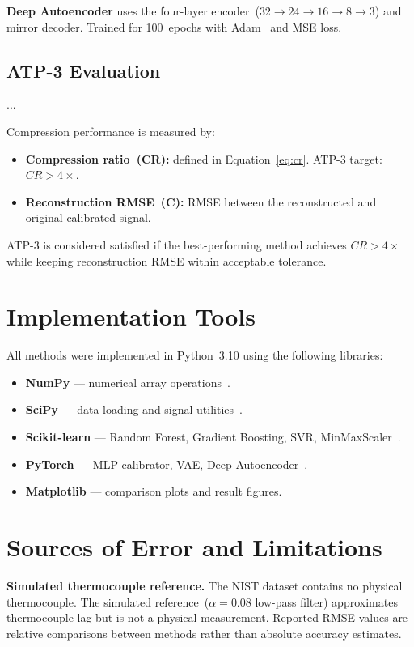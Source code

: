 \textbf{Deep Autoencoder} uses the four-layer encoder~($32\!\rightarrow\!24\!\rightarrow\!16\!\rightarrow\!8\!\rightarrow\!3$) and mirror decoder. Trained for 100~epochs with Adam~\cite{kingma2014adam} and MSE loss.

\subsection{ATP-3 Evaluation}
...

Compression performance is measured by:
\begin{itemize}[leftmargin=2em, nosep]
\item \textbf{Compression ratio~(CR):} defined in Equation~\eqref{eq:cr}. ATP-3 target: $CR > 4\times$.
\item \textbf{Reconstruction RMSE~(\textdegree C):} RMSE between the reconstructed and original calibrated signal.
\end{itemize}

ATP-3 is considered satisfied if the best-performing method achieves $CR > 4\times$ while keeping reconstruction RMSE within acceptable tolerance.

\section{Implementation Tools}
\label{sec:tools}

All methods were implemented in Python~3.10 using the following libraries:
\begin{itemize}[leftmargin=2em, nosep]
\item \textbf{NumPy} --- numerical array operations~\cite{scipy}.
\item \textbf{SciPy} --- data loading and signal utilities~\cite{scipy}.
\item \textbf{Scikit-learn} --- Random Forest, Gradient Boosting, SVR, MinMaxScaler~\cite{scikit-learn}.
\item \textbf{PyTorch} --- MLP calibrator, VAE, Deep Autoencoder~\cite{pytorch}.
\item \textbf{Matplotlib} --- comparison plots and result figures.
\end{itemize}

\section{Sources of Error and Limitations}
\label{sec:limitations-ch3}

\textbf{Simulated thermocouple reference.} The NIST dataset contains no physical thermocouple. The simulated reference~($\alpha=0.08$ low-pass filter) approximates thermocouple lag but is not a physical measurement. Reported RMSE values are relative comparisons between methods rather than absolute accuracy estimates.

